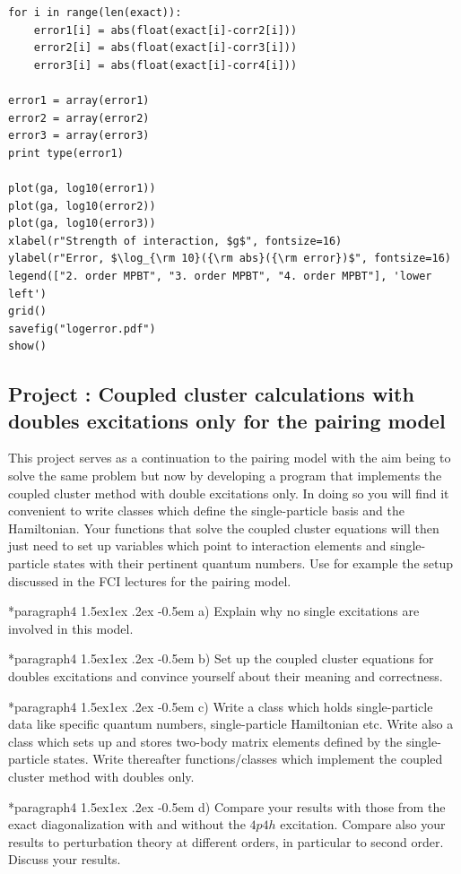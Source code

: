 \documentclass[%
twoside,                 %
final,                   %
10pt]{article}
\makeatletter
\newenvironment{doconceexercise}{}{}
\newcounter{doconceexercisecounter}
\newcommand\subex{\@startsection*{paragraph}{4}{\z@}%
                  {1.5ex\@plus1ex \@minus.2ex}%
                  {-0.5em}%
                  {\normalfont\normalsize\bfseries}}
\makeatother
\begin{document}
\begin{doconceexercise}
\begin{verbatim}
for i in range(len(exact)):
	error1[i] = abs(float(exact[i]-corr2[i]))
	error2[i] = abs(float(exact[i]-corr3[i]))
	error3[i] = abs(float(exact[i]-corr4[i]))

error1 = array(error1)
error2 = array(error2)
error3 = array(error3)
print type(error1)

plot(ga, log10(error1))
plot(ga, log10(error2))
plot(ga, log10(error3))
xlabel(r"Strength of interaction, $g$", fontsize=16)
ylabel(r"Error, $\log_{\rm 10}({\rm abs}({\rm error})$", fontsize=16)
legend(["2. order MPBT", "3. order MPBT", "4. order MPBT"], 'lower left')
grid()
savefig("logerror.pdf")
show()
\end{verbatim}


\end{doconceexercise}




\begin{doconceexercise}

\subsection*{Project \thedoconceexercisecounter: Coupled cluster calculations with doubles excitations only for the pairing model}


This project serves as a continuation to the pairing model with the aim being to solve the same problem but now by developing
a program that implements the coupled cluster method with double excitations only. In doing so you will find it convenient to write 
classes which define the single-particle basis and the Hamiltonian. Your functions that solve the coupled cluster equations will then just need to set up variables which point to interaction elements and single-particle states with their pertinent quantum numbers. Use for example the setup discussed in the FCI lectures for the pairing model.


\subex{a)}
Explain why no single excitations are involved in this model.

\subex{b)}
Set up the coupled cluster equations for doubles excitations and convince yourself about their meaning and correctness.

\subex{c)}
Write a class which holds single-particle data like specific quantum numbers, single-particle Hamiltonian etc. Write also a class which sets up and stores two-body matrix elements defined by the single-particle states.  Write thereafter functions/classes which implement the coupled cluster method with doubles only.

\subex{d)}
Compare your results with those from the exact diagonalization with and without the $4p4h$ excitation. Compare also your results to perturbation theory at different orders, in particular to second order. Discuss your results.

\end{doconceexercise}
\end{document}
